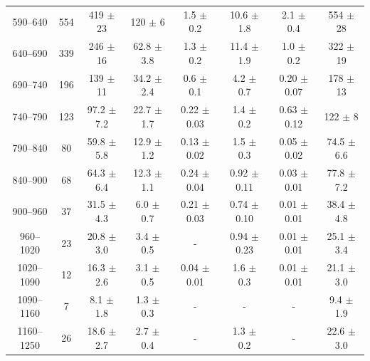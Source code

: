 \begin{table}[htb]
\begin{center}
\begin{tabular}{c|c|c|c|c|c|c|c}
590--640 & 554    & 419 $\pm$ 23     & 120 $\pm$ 6      & 1.5 $\pm$ 0.2   & 10.6 $\pm$ 1.8   & 2.1 $\pm$ 0.4    & 554 $\pm$ 28 \\
640--690 & 339    & 246 $\pm$ 16     & 62.8 $\pm$ 3.8   & 1.3 $\pm$ 0.2   & 11.4 $\pm$ 1.9   & 1.0 $\pm$ 0.2    & 322 $\pm$ 19 \\
690--740 & 196    & 139 $\pm$ 11     & 34.2 $\pm$ 2.4   & 0.6 $\pm$ 0.1   & 4.2 $\pm$ 0.7    & 0.20 $\pm$ 0.07  & 178 $\pm$ 13 \\
740--790 & 123    & 97.2 $\pm$ 7.2   & 22.7 $\pm$ 1.7   & 0.22 $\pm$ 0.03 & 1.4 $\pm$ 0.2    & 0.63 $\pm$ 0.12  & 122 $\pm$ 8 \\
790--840 & 80     & 59.8 $\pm$ 5.8   & 12.9 $\pm$ 1.2   & 0.13 $\pm$ 0.02 & 1.5 $\pm$ 0.3    & 0.05 $\pm$ 0.02  & 74.5 $\pm$ 6.6 \\
840--900 & 68     & 64.3 $\pm$ 6.4   & 12.3 $\pm$ 1.1   & 0.24 $\pm$ 0.04 & 0.92 $\pm$ 0.11  & 0.03 $\pm$ 0.01  & 77.8 $\pm$ 7.2 \\
900--960 & 37     & 31.5 $\pm$ 4.3   & 6.0 $\pm$ 0.7    & 0.21 $\pm$ 0.03 & 0.74 $\pm$ 0.10  & 0.01 $\pm$ 0.01  & 38.4 $\pm$ 4.8 \\
960--1020 & 23    & 20.8 $\pm$ 3.0   & 3.4 $\pm$ 0.5    & -               & 0.94 $\pm$ 0.23  & 0.01 $\pm$ 0.01  & 25.1 $\pm$ 3.4 \\
1020--1090 & 12   & 16.3 $\pm$ 2.6   & 3.1 $\pm$ 0.5    & 0.04 $\pm$ 0.01 & 1.6  $\pm$ 0.3   & 0.01 $\pm$ 0.01  & 21.1 $\pm$ 3.0 \\
1090--1160 & 7    & 8.1 $\pm$ 1.8    & 1.3 $\pm$ 0.3    & -               & -                & -                & 9.4 $\pm$ 1.9 \\
1160--1250 & 26   & 18.6 $\pm$ 2.7   & 2.7 $\pm$ 0.4    & -               & 1.3 $\pm$ 0.2    & -                & 22.6 $\pm$ 3.0 \\
 \hline
\end{tabular}
\end{center}
\label{tab:monojettab}
\end{table}


